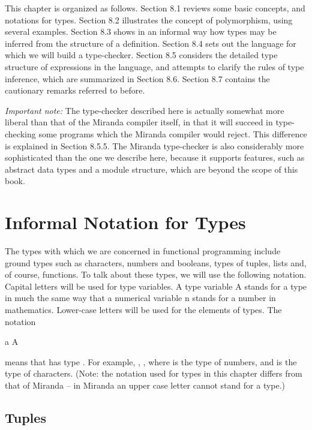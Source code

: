 This chapter is organized as follows. Section 8.1 reviews some basic
concepts, and notations for types. Section 8.2 illustrates the concept of
polymorphism, using several examples. Section 8.3 shows in an informal way
how types may be inferred from the structure of a definition. Section 8.4 sets
out the language for which we will build a type-checker. Section 8.5 considers
the detailed type structure of expressions in the language, and attempts to
clarify the rules of type inference, which are summarized in Section 8.6.
Section 8.7 contains the cautionary remarks referred to before.

\textit{Important note:} The type-checker described here is actually somewhat
more liberal than that of the Miranda compiler itself, in that it will succeed in
type-checking some programs which the Miranda compiler would reject. This
difference is explained in Section 8.5.5. The Miranda type-checker is also
considerably more sophisticated than the one we describe here, because it
supports features, such as abstract data types and a module structure, which
are beyond the scope of this book.

\section{Informal Notation for Types}

The types with which we are concerned in functional programming include
ground types such as characters, numbers and booleans, types of tuples, lists
and, of course, functions. To talk about these types, we will use the following
notation. Capital letters will be used for type variables. A type variable A
stands for a type in much the same way that a numerical variable n stands for a
number in mathematics. Lower-case letters will be used for the elements of
types. The notation
\begin{mlcoded}
a \hastype{} A
\end{mlcoded}
means that  has type . For example, , , where  is the
type of numbers, and  is the type of characters. (Note: the notation used
for types in this chapter differs from that of Miranda -- in Miranda an upper
case letter cannot stand for a type.)

\subsection{Tuples}

